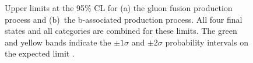 \begin{figure}[h!]
\begin{center}
\end{center}
\caption[Upper limits at the 95\% CL for the gluon fusion production process and the
b-associated production process, combining all final states and categories.]{Upper limits at the 95\% CL for (a) the gluon fusion production
process and (b)~the b-associated production process. All four final states and 
all categories are combined for these limits. The green and yellow bands indicate
the $\pm 1\sigma$ and $\pm 2\sigma$ probability intervals on the expected limit \cite{CMS-PAS-HIG-16-037}.}
\label{fig:mssm_results_limits}
\end{figure}
